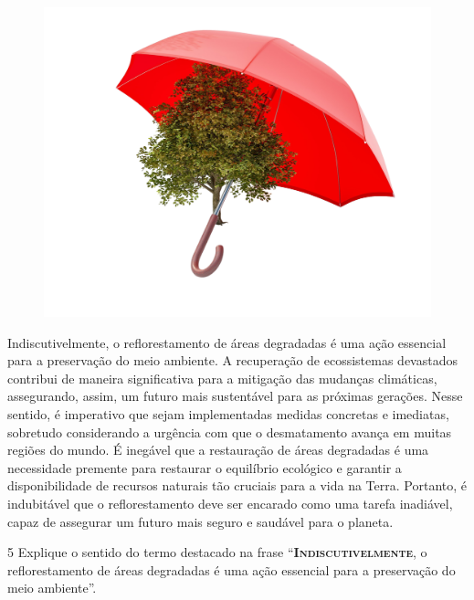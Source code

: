 \begin{myquote}

\begin{figure}[H]
\centering
\includegraphics[scale=0.25]{./imgSAEB_7_POR/media/image49.png}
\end{figure}

Indiscutivelmente, o reflorestamento de áreas degradadas é uma ação essencial
para a preservação do meio ambiente. A recuperação de
ecossistemas devastados contribui de maneira significativa para a mitigação das
mudanças climáticas, assegurando, assim, um futuro mais sustentável para as
próximas gerações. Nesse sentido, é imperativo que sejam implementadas medidas
concretas e imediatas, sobretudo considerando a urgência com que o
desmatamento avança em muitas regiões do mundo. É inegável que a restauração
de áreas degradadas é uma necessidade premente para restaurar o equilíbrio
ecológico e garantir a disponibilidade de recursos naturais tão cruciais para
a vida na Terra. Portanto, é indubitável que o reflorestamento deve ser
encarado como uma tarefa inadiável, capaz de assegurar um futuro mais seguro e
saudável para o planeta.


\end{myquote}

\num{5} Explique o sentido do termo destacado na frase ``\textsc{\textbf{Indiscutivelmente}}, o
reflorestamento de áreas degradadas é uma ação essencial para a preservação do
meio ambiente''.

